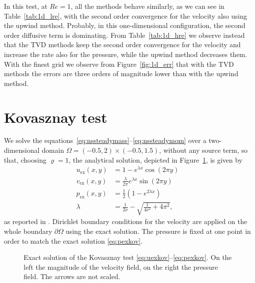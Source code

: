 In this test, at $Re=1$, all the methods behave similarly, as we 
can see in Table~\ref{tab:1d_lre}, with the second order convergence for the 
velocity also using the upwind method. Probably, in this one-dimensional 
configuration, the second order diffusive term is dominating. From 
Table~\ref{tab:1d_hre} we observe instead that the TVD methods keep the second order 
convergence for the velocity and increase the rate also for the pressure, while 
the upwind method decreases them. With the finest grid we observe from 
Figure~\ref{fig:1d_err} that with the TVD methods the errors are three orders of 
magnitude lower than with the upwind method.

%
\section{Kovasznay test}
We solve the equations~\eqref{eq:nssteadymass}--\eqref{eq:nssteadymom} over a 
two-dimensional domain $\Omega=(-0.5, 2) \times (-0.5,1.5)$, without any source 
term, so that, choosing $\varrho=1$, the analytical solution, depicted in 
Figure~\ref{fig:kovexact}, is given by
\begin{align}
\label{eq:uexkov} u_\text{ex}(x,y) &= 1-e^{\lambda x} \cos (2 \pi y)\\
v_\text{ex}(x,y) &= \frac{\lambda}{2\pi} e^{\lambda x} \sin (2\pi y)\\
\label{eq:pexkov}	p_\text{ex}(x,y) &= \frac{1}{2}(1 -e^{2\lambda x})\\
\lambda &= \frac{1}{2 \nu} - \sqrt{\frac{1}{4 \nu^2} + 4\pi^2},
\end{align}
as reported in \cite{test:kovasznay}.
Dirichlet boundary conditions for the velocity are applied on the whole 
boundary $\partial \Omega$ using the exact solution. The pressure is fixed at 
one point in order to match the exact solution \eqref{eq:pexkov}.
\begin{figure}
	\centering
	\caption[Exact solution of the Kovasznay test]{Exact solution of the 
	Kovasznay test \eqref{eq:uexkov}--\eqref{eq:pexkov}. On the left the 
	magnitude of the velocity field, on the 
	right the pressure field. The arrows are not scaled.}
	\label{fig:kovexact}
\end{figure}


